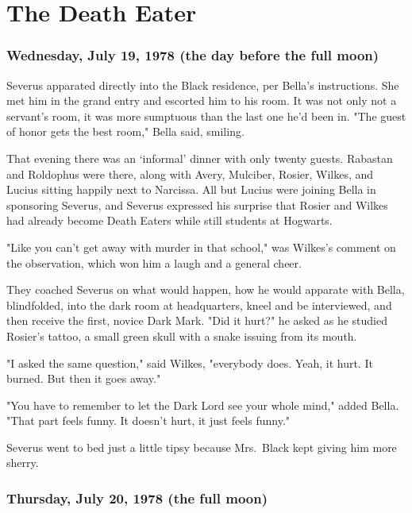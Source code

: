 
\chapter{The Death Eater}

\subsection{Wednesday, July 19, 1978 (the day before the full moon)}

Severus apparated directly into the Black residence, per Bella's instructions. She met him in the grand entry and escorted him to his room. It was not only not a servant's room, it was more sumptuous than the last one he'd been in. "The guest of honor gets the best room," Bella said, smiling.

That evening there was an `informal' dinner with only twenty guests. Rabastan and Roldophus were there, along with Avery, Mulciber, Rosier, Wilkes, and Lucius sitting happily next to Narcissa. All but Lucius were joining Bella in sponsoring Severus, and Severus expressed his surprise that Rosier and Wilkes had already become Death Eaters while still students at Hogwarts.

"Like you can't get away with murder in that school," was Wilkes's comment on the observation, which won him a laugh and a general cheer.

They coached Severus on what would happen, how he would apparate with Bella, blindfolded, into the dark room at headquarters, kneel and be interviewed, and then receive the first, novice Dark Mark. "Did it hurt?" he asked as he studied Rosier's tattoo, a small green skull with a snake issuing from its mouth.

"I asked the same question," said Wilkes, "everybody does. Yeah, it hurt. It burned. But then it goes away."

"You have to remember to let the Dark Lord see your whole mind," added Bella. "That part feels funny. It doesn't hurt, it just feels funny."

Severus went to bed just a little tipsy because Mrs.~Black kept giving him more sherry.

\subsection{Thursday, July 20, 1978 (the full moon)}

